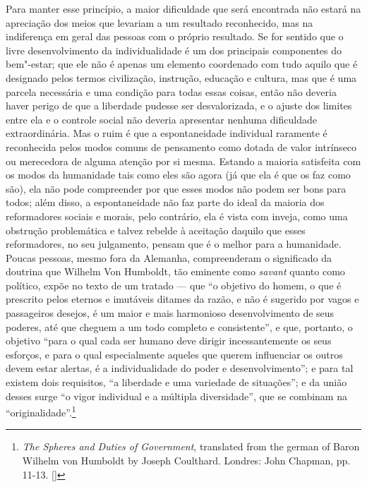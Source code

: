 Para manter esse princípio, a maior dificuldade que será encontrada não
estará na apreciação dos meios que levariam a um resultado reconhecido,
mas na indiferença em geral das pessoas com o próprio resultado. Se for
sentido que o livre desenvolvimento da individualidade é um dos
principais componentes do bem"-estar; que ele não é apenas um elemento
coordenado com tudo aquilo que é designado pelos termos civilização,
instrução, educação e cultura, mas que é uma parcela necessária e uma
condição para todas essas coisas, então não deveria haver perigo de que a
liberdade pudesse ser desvalorizada, e o ajuste dos limites entre
ela e o controle social não deveria apresentar nenhuma dificuldade
extraordinária. Mas o ruim é que a espontaneidade individual raramente
é reconhecida pelos modos comuns de pensamento como dotada de valor
intrínseco ou merecedora de alguma atenção por si mesma. Estando a maioria 
satisfeita com os modos da humanidade tais como eles são agora
(já que ela é que os faz como são), ela não pode compreender por que esses
modos não podem ser bons para todos; além disso, a espontaneidade não
faz parte do ideal da maioria dos reformadores sociais e morais, pelo
contrário, ela é vista com inveja, como uma obstrução
problemática e talvez rebelde à aceitação daquilo que esses
reformadores, no seu julgamento, pensam que é o melhor para a
humanidade. Poucas pessoas, mesmo fora da Alemanha, compreenderam o
significado da doutrina que Wilhelm Von Humboldt, tão eminente como
\textit{savant} quanto como  político, expõe no texto de um tratado
 --- que ``o objetivo do homem, o que é prescrito pelos eternos e
imutáveis ditames da razão, e não é \mbox{sugerido} por vagos e passageiros
desejos, é um maior e mais harmonioso desenvolvimento de seus poderes,
até que cheguem a um todo completo e consistente'', e que, portanto, o
objetivo ``para o qual cada ser humano deve dirigir incessantemente os seus
esforços, e para o qual especialmente aqueles que querem influenciar os
outros devem estar alertas, é a individualidade do poder e
desenvolvimento''; e para tal existem dois requisitos, ``a liberdade e
uma variedade de situações''; e da união desses surge ``o vigor
individual e a múltipla diversidade'', que se combinam na 
``originalidade''.\footnote{ \textit{The Spheres and Duties of Government}, 
translated from the german of Baron Wilhelm von Humboldt by Joseph Coulthard. 
Londres: John Chapman, pp. 11-13. []}

